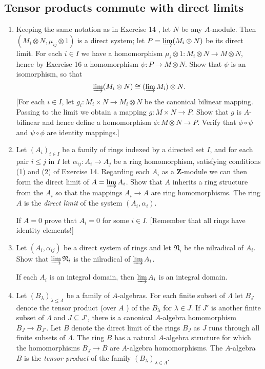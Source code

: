 \documentclass{standalone}
\theoremstyle{definition}
\theoremstyle{remark}
\begin{document}
\subsection{Tensor products commute with direct limits}
\begin{enumerate}[resume*=exc2]
  \item Keeping the same notation as in Exercise 14 , let $N$ be any $A$-module.
        Then $(M_{i} \otimes N, \mu_{i j} \otimes 1)$ is a direct
        system; let $P=\varinjlim(M_{i} \otimes N)$ be its
        direct limit. For each $i \in I$ we have a homomorphism
        $\mu_{i} \otimes 1\colon M_{i} \otimes N \to M \otimes N$, hence by Exercise
        16 a homomorphism $\psi\colon P \to M \otimes N$. Show that $\psi$ is an
        isomorphism, so that
\[
  \varinjlim(M_{i} \otimes N) \cong(\varinjlim M_{i}) \otimes N .
\]
[For each $i \in I$, let $g_{i}: M_{i} \times N \to M_{i} \otimes N$ be the
canonical bilinear mapping. Passing to the limit we obtain a mapping
$g: M \times N \to P$. Show that $g$ is $A$-bilinear and hence define a
homomorphism $\phi: M \otimes N \to P$. Verify that $\phi \circ \psi$ and
$\psi \circ \phi$ are identity mappings.]
  \item Let $(A_{i})_{i\in I}$ be a family of rings indexed by
        a directed set $I$, and for each pair $i \le j$ in $I$ let
        $\alpha_{i j}: A_{i} \to A_{j}$ be a ring homomorphism, satisfying
        conditions (1) and (2) of Exercise 14. Regarding each $A_{i}$ as a
        $\mathbf{Z}$-module we can then form the direct limit of
        $A=\varinjlim A_{i}$. Show that $A$ inherits a ring
        structure from the $A_{i}$ so that the mappings
        $A_{i} \to A$ are ring homomorphisms. The ring $A$ is
        the {\itshape direct limit} of the system $(A_{i},
        \alpha_{i})$.
        
If $A=0$ prove that $A_{i}=0$ for some $i \in I$. [Remember that all rings have
identity elements!]
  \item Let $(A_{i}, \alpha_{i j})$ be a direct system of rings and
        let $\mathfrak{N}_{i}$ be the nilradical of $A_{i}$. Show that
        $\varinjlim\mathfrak{N}_{i}$ is the nilradical
        of $\varinjlim A_{i}$.
        
If each $A_{i}$ is an integral domain, then
$\varinjlim A_{i}$ is an integral domain.
  \item Let $(B_{\lambda})_{\lambda \leq \Lambda}$ be a family of
        $A$-algebras. For each finite subset of $\Lambda$ let $B_{J}$ denote the
        tensor product (over $A$ ) of the $B_{\lambda}$ for $\lambda \in J$. If
        $J'$ is another finite subset of $\Lambda$ and $J \subseteq J'$, there
        is a canonical $A$-algebra homomorphism $B_{J} \to B_{J'}$. Let $B$
        denote the direct limit of the rings $B_{J}$ as $J$ runs through all
        finite subsets of $\Lambda$. The ring $B$ has a natural $A$-algebra
        structure for which the homomorphisms $B_{J} \to B$ are $A$-algebra
        homomorphisms. The $A$-algebra $B$ is the {\itshape tensor
          product} of the family $(B_{\lambda})_{\lambda \in
          \Lambda}$. 
\end{enumerate}
\end{document}
